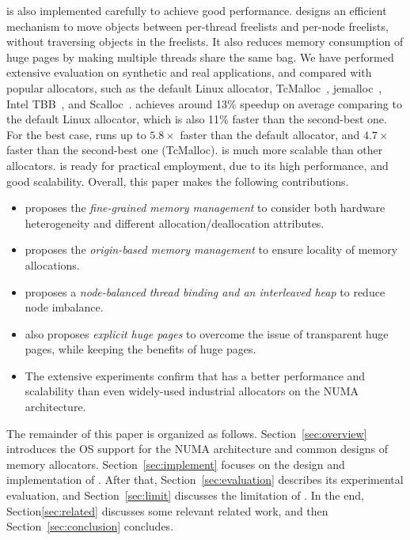 \NM{} is also implemented carefully to achieve good performance. \NM{} designs an efficient mechanism to move objects between per-thread freelists and per-node freelists, without traversing objects in the freelists. It also reduces memory consumption of huge pages by making multiple threads share the same bag. 
We have performed extensive evaluation on synthetic and real applications, and compared \NM{} with popular allocators, such as the default Linux allocator, TcMalloc~\cite{tcmalloc}, jemalloc~\cite{jemalloc}, Intel TBB~\cite{tbb}, and Scalloc~\cite{Scalloc}. \NM{} achieves around 13\% speedup on average comparing to the default Linux allocator, which is also 11\% faster than the second-best one. For the best case, \NM{} runs up to $5.8\times$ faster than the default allocator, and $4.7\times$ faster than the second-best one (TcMalloc). \NM{} is much more scalable than other allocators. \NM{} is ready for practical employment, due to its high performance, and good scalability. Overall, this paper makes the following contributions. 

\begin{itemize}

\item \NM{} proposes the \textit{fine-grained memory management} to consider both hardware heterogeneity and different allocation/deallocation attributes.

\item \NM{} proposes the \textit{origin-based memory management} to ensure locality of memory allocations.  

\item \NM{} proposes a \textit{node-balanced thread binding and an interleaved heap} to reduce node imbalance. 

\item \NM{} also proposes \textit{explicit huge pages} to overcome the issue of transparent huge pages, while keeping the benefits of huge pages. 

\item The extensive experiments confirm that \NM{} has a better performance and scalability than even widely-used industrial allocators on the NUMA architecture. 

\end{itemize}

The remainder of this paper is organized as follows. Section~\ref{sec:overview} introduces the OS support for the NUMA architecture and common designs of memory allocators. Section~\ref{sec:implement} focuses on the design and implementation of \NM{}. After that, Section~\ref{sec:evaluation} describes its experimental evaluation, and Section~\ref{sec:limit} discusses the limitation of \NM{}. In the end, Section\ref{sec:related} discusses some relevant related work, and then Section~\ref{sec:conclusion} concludes. 

